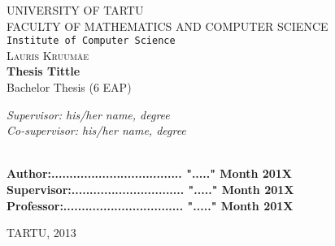 \begin{titlepage}

\begin{center}



\textsc{UNIVERSITY OF TARTU}\\

\textsc{FACULTY OF MATHEMATICS AND COMPUTER SCIENCE}\\

\texttt{Institute of Computer Science}\\[6cm]

\textsc{ \large Lauris Kruumäe}\\[0.5cm]
{\Huge \bfseries Thesis Tittle}\\[0.5cm]
{\large Bachelor Thesis (6 EAP)}\\[3cm]



\begin{minipage}{0.8\textwidth}
\begin{flushright} \large
\emph{Supervisor: his/her name, degree}  \\	  %
\emph{Co-supervisor: his/her name, degree}  %
\end{flushright}
\end{minipage}

\textbf{}\\[1.0cm]

\textbf{Author:.................................... "....." Month   201X}\\[0.5cm]

\textbf{Supervisor:............................... "....." Month   201X}\\[0.5cm]

\textbf{Professor:................................. "....." Month   201X}\\[0.5cm]        

\vfill

{\large TARTU, 2013}

\end{center}

\end{titlepage}
